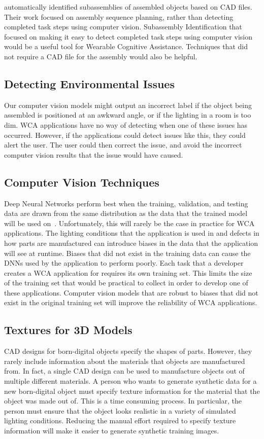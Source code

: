 \citet{subassembly_identification} automatically identified subassemblies of
assembled objects based on CAD files.
Their work focused on assembly sequence
planning, rather than detecting completed task steps using computer vision.
Subassembly Identification that focused on making it easy to detect completed
task steps using computer vision would be a useful tool for Wearable Cognitive
Assistance.
Techniques that did not require a CAD file for the assembly would also be
helpful.

\subsection{Detecting Environmental Issues}

Our computer vision models might output an incorrect label if the object being
assembled is positioned at an awkward angle, or if the lighting in a room is
too dim.
WCA applications have no way of detecting when one of these issues has
occurred.
However, if the applications could detect issues like this, they could alert the
user.
The user could then correct the issue, and avoid the incorrect computer vision
results that the issue would have caused.

\subsection{Computer Vision Techniques}

Deep Neural Networks perform best when the training, validation, and testing
data are drawn from the same distribution as the data that the trained model
will be used on~\cite{pmlr-v97-recht19a}.
Unfortunately, this will rarely be the case in practice for WCA applications.
The lighting conditions that the application is used in and defects in how parts
are manufactured can introduce biases in the data that the application will see
at runtime.
Biases that did not exist in the training data can cause the DNNs used by the
application to perform poorly.
Each task that a developer creates a WCA application for requires its own
training set.
This limits the size of the training set that would be practical to collect in
order to develop one of these applications.
Computer vision models that are robust to biases that did not exist in the
original training set will improve the reliability of WCA applications.

\subsection{Textures for 3D Models}

CAD designs for born-digital objects specify the shapes of parts.
However, they rarely include information about the materials that objects are
manufactured from.
In fact, a single CAD design can be used to manufacture objects out of multiple
different materials.
A person who wants to generate synthetic data for a new born-digital object must
specify texture information for the material that the object was made out of.
This is a time consuming process.
In particular, the person must ensure that the object looks realistic in a
variety of simulated lighting conditions.
Reducing the manual effort required to specify texture information will make it
easier to generate synthetic training images.
